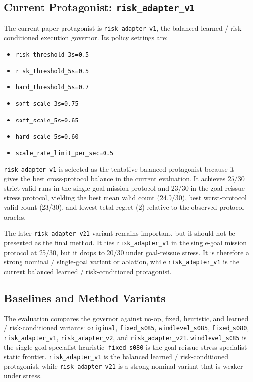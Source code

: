 \subsection{Current Protagonist: \texttt{risk\_adapter\_v1}}

The current paper protagonist is \texttt{risk\_adapter\_v1}, the balanced
learned / risk-conditioned execution governor. Its policy settings are:

\begin{itemize}
  \item \texttt{risk\_threshold\_3s=0.5}
  \item \texttt{risk\_threshold\_5s=0.5}
  \item \texttt{hard\_threshold\_5s=0.7}
  \item \texttt{soft\_scale\_3s=0.75}
  \item \texttt{soft\_scale\_5s=0.65}
  \item \texttt{hard\_scale\_5s=0.60}
  \item \texttt{scale\_rate\_limit\_per\_sec=0.5}
\end{itemize}

\texttt{risk\_adapter\_v1} is selected as the tentative balanced protagonist
because it gives the best cross-protocol balance in the current evaluation. It
achieves 25/30 strict-valid runs in the single-goal mission protocol and 23/30
in the goal-reissue stress protocol, yielding the best mean valid count
(24.0/30), best worst-protocol valid count (23/30), and lowest total regret
(2) relative to the observed protocol oracles.

The later \texttt{risk\_adapter\_v21} variant remains important, but it should
not be presented as the final method. It ties \texttt{risk\_adapter\_v1} in the
single-goal mission protocol at 25/30, but it drops to 20/30 under goal-reissue
stress. It is therefore a strong nominal / single-goal variant or ablation,
while \texttt{risk\_adapter\_v1} is the current balanced learned /
risk-conditioned protagonist.

\subsection{Baselines and Method Variants}

The evaluation compares the governor against no-op, fixed, heuristic, and
learned / risk-conditioned variants: \texttt{original}, \texttt{fixed\_s085},
\texttt{windlevel\_s085}, \texttt{fixed\_s080},
\texttt{risk\_adapter\_v1}, \texttt{risk\_adapter\_v2}, and
\texttt{risk\_adapter\_v21}. \texttt{windlevel\_s085} is the single-goal
specialist heuristic. \texttt{fixed\_s080} is the goal-reissue stress
specialist static frontier. \texttt{risk\_adapter\_v1} is the balanced learned
/ risk-conditioned protagonist, while \texttt{risk\_adapter\_v21} is a strong
nominal variant that is weaker under stress.

